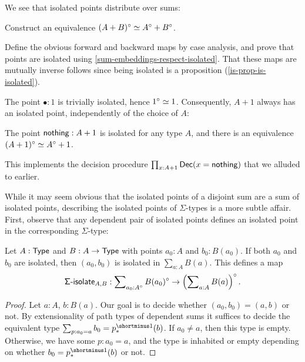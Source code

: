 We see that isolated points distribute over sums:
\begin{problem}\label{isolated-sum-equiv}
  Construct an equivalence \( (A + B)^{\circ} \simeq A^{\circ} + B^{\circ} \).
  \begin{construction}
    Define the obvious forward and backward maps by case analysis,
    and prove that points are isolated using \autoref{sum-embeddings-respect-isolated}.
    That these maps are mutually inverse follows since being isolated is a proposition (\autoref{is-prop-is-isolated}).
  \end{construction}
\end{problem}

The point \( \bullet : 1 \) is trivially isolated, hence \( 1^{\circ} \simeq 1 \).
Consequently, \( A + 1 \) always has an isolated point, independently of the choice of \( A \):
\begin{corollary}\label{is-isolated-nothing}
  The point \( \operatorname{\mathsf{nothing}} : A + 1 \) is isolated for any type \( A \),
  and there is an equivalence \( (A + 1)^{\circ} \simeq A^{\circ} + 1 \).
\end{corollary}
This implements the decision procedure \( \prod_{x : A + 1} \mathsf{Dec}(x = \operatorname{\mathsf{nothing}}) \) that we alluded to earlier.

While it may seem obvious that the isolated points of a disjoint sum are a sum of isolated points,
describing the isolated points of \( \Sigma \)-types is a more subtle affair.
First, observe that any dependent pair of isolated points defines an isolated point in the corresponding \( \Sigma \)-type:
\begin{proposition}\label{is-isolated-pair}\label{sigma-isolate}
  Let \( A : \operatorname{\mathsf{Type}} \) and \( B : A \to \operatorname{\mathsf{Type}} \) with points \( a_0 : A \) and \( b_0 : B(a_0) \).
  If both \( a_0 \) and \( b_0 \) are isolated, then \( (a_0 , b_0) \) is isolated in \( \sum_{a : A} B(a) \).
  This defines a map
  \[
    \SigmaIsolate_{A,B} :
      \sum\nolimits_{a_0 : \Isolated{A}} \Isolated{B(a_0)}
        \to
      \Isolated{%
        \left(
          \sum\nolimits_{a : A} B(a)
        \right)
      }.
  \]
  \begin{proof}
    Let \( a : A \), \( b : B(a) \). Our goal is to decide whether \( (a_0 , b_0) = (a, b) \) or not.
    By extensionality of path types of dependent sums
    it suffices to decide the equivalent type \( \sum_{p : a_0 = a} b_0 = p^{\Inv}_*(b) \).
    If \( a_0 \neq a \), then this type is empty.
    Otherwise, we have some \( p : a_0 = a \), and the type is inhabited or empty
    depending on whether \( b_0 = p^{\Inv}_*(b) \) or not.
  \end{proof}
\end{proposition}

